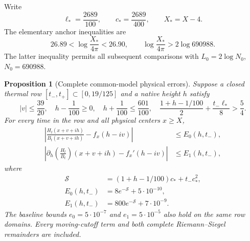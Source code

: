 \documentclass[11pt,a4paper]{article}
\newtheorem{proposition}[theorem]{Proposition}
\theoremstyle{definition}
\theoremstyle{remark}
\begin{document}
Write
\[
 \ell_*=\frac{2689}{100},\qquad c_*=\frac{2689}{400},\qquad
 X_*=X-4.
\]
The elementary anchor inequalities are
\[
 26.89<\log\frac{X_*}{4\pi}<26.90,
 \qquad \log\frac{X_*}{4\pi}>2\log 690988.
\]
The latter inequality permits all subsequent comparisons with
$L_0=2\log N_0$, $N_0=690988$.

\begin{proposition}[Complete common-model physical errors]
\label{src:physical}
Suppose a closed thermal row $[t_-,t_+]\subset[0,19/125]$ and a native
height $h$ satisfy
\begin{equation}
 |v|\leq\frac{39}{20},\quad h-\frac1{100}\geq0,\quad
 h+\frac1{100}\leq\frac{601}{100},\quad
 \frac{1+h-1/100}{2}+\frac{t_-\ell_*}{8}>\frac54.
 \label{src:physical-guard}
\end{equation}
For every time in the row and all physical centers $x\geq X$,
\begin{align}
 \left|\frac{H_t(x+v+ih)}{B_t(x+v+ih)}-f_x(h-iv)\right|
       &\leq E_0(h,t_-),\label{src:E0}\\
 \left|\partial_h\left(\frac{H_t}{B_t}\right)(x+v+ih)
                      -f_x'(h-iv)\right|
       &\leq E_1(h,t_-),\label{src:E1}
\end{align}
where
\begin{equation}
 \begin{split}
 \mathcal S&=(1+h-1/100)c_*+t_-c_*^2,\\
 E_0(h,t_-)&=8e^{-\mathcal S}+5\cdot10^{-10},\\
 E_1(h,t_-)&=800e^{-\mathcal S}+7\cdot10^{-9}.
 \end{split}\label{src:matched-errors}
\end{equation}
The baseline bounds $e_0=5\cdot10^{-7}$ and $e_1=5\cdot10^{-5}$ also
hold on the same row domains.  Every moving-cutoff term and both complete
Riemann--Siegel remainders are included.
\end{proposition}
\end{document}
